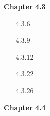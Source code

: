 \documentclass[10pt,twoside,reqno]{article}
\begin{document}
\vspace{5mm}
\textbf{Chapter 4.3}
\begin{enumerate}
\item[4.3.6]
\vspace{3mm}

\vspace{3mm}
\item[4.3.9]
\vspace{3mm}

\vspace{3mm}
\item[4.3.12]
\vspace{3mm}

\vspace{3mm}
\item[4.3.22]
\vspace{3mm}

\vspace{3mm}
\item[4.3.26]
\vspace{3mm}

\vspace{3mm}

\end{enumerate}
\vspace{5mm}
\textbf{Chapter 4.4}
\end{document}
